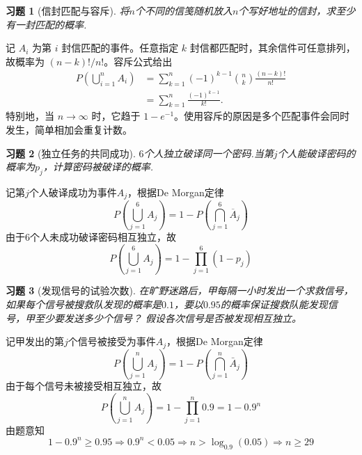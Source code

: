 \documentclass[12pt,fontset=fandol]{ctexart}
\newtheorem{exercise}{习题}[section]
\begin{document}
\begin{exercise}[信封匹配与容斥]\label{q:Y2.5}
将$n$个不同的信笺随机放入$n$个写好地址的信封，求至少有一封匹配的概率.\par{}
\end{exercise}

\begin{solve}\label{a:Y2.5}记 $A_i$ 为第 $i$ 封信匹配的事件。任意指定 $k$ 封信都匹配时，其余信件可任意排列，故概率为 $(n-k)!/n!$。容斥公式给出\[\begin{aligned}P\left(\bigcup_{i=1}^nA_i\right)&=\sum_{k=1}^n(-1)^{k-1}\binom nk\frac{(n-k)!}{n!}\\&=\sum_{k=1}^n\frac{(-1)^{k-1}}{k!}.\end{aligned}\]特别地，当 $n\to\infty$ 时，它趋于 $1-e^{-1}$。使用容斥的原因是多个匹配事件会同时发生，简单相加会重复计数。\end{solve}

\begin{exercise}[独立任务的共同成功]\label{q:Y2.6}
$6$个人独立破译同一个密码.当第$j$个人能破译密码的概率为$p_j$，计算密码被破译的概率.\par{}
\end{exercise}

\begin{solve}\label{a:Y2.6}
记第$j$个人破译成功为事件$A_j$，根据De Morgan定律
\[P(\bigcup\limits_{j = 1}^6 {{A_j}} ) = 1 - P(\bigcap\limits_{j = 1}^6 {{{\overline A }_j}} )\]
由于$6$个人未成功破译密码相互独立，故
\[P(\bigcup\limits_{j = 1}^6 {{A_j}} ) = 1 - \prod\limits_{j = 1}^6 {(1 - {p_j})} \]
\end{solve}

\begin{exercise}[发现信号的试验次数]\label{q:Y2.7}
在旷野迷路后，甲每隔一小时发出一个求救信号，如果每个信号被搜救队发现的概率是$0.1$，要以$0.95$的概率保证搜救队能发现信号，甲至少要发送多少个信号？ 假设各次信号是否被发现相互独立。\par{}
\end{exercise}

\begin{solve}\label{a:Y2.7}
记甲发出的第$j$个信号被接受为事件$A_j$，根据De Morgan定律
\[P(\bigcup\limits_{j = 1}^n {{A_j}} ) = 1 - P(\bigcap\limits_{j = 1}^n {{{\bar A}_j}} )\]
由于每个信号未被接受相互独立，故
\[P(\bigcup\limits_{j = 1}^n {{A_j}} ) = 1 - \prod\limits_{j = 1}^n {0.9}  = 1 - {0.9^n}\]
由题意知
\[1 - {0.9^n} \geqslant 0.95 \Rightarrow {0.9^n} < 0.05 \Rightarrow n > {\log _{0.9}}(0.05) \Rightarrow n \geqslant 29\]
\end{solve}
\end{document}
